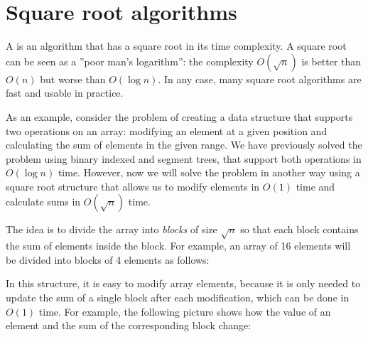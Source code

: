 \chapter{Square root algorithms}


A  is an algorithm
that has a square root in its time complexity.
A square root can be seen as a ''poor man's logarithm'':
the complexity $O(\sqrt n)$ is better than $O(n)$
but worse than $O(\log n)$.
In any case, many square root algorithms are fast and usable in practice.

As an example, consider the problem of
creating a data structure that supports
two operations on an array:
modifying an element at a given position
and calculating the sum of elements in the given range.
We have previously solved the problem using
binary indexed and segment trees,
that support both operations in $O(\log n)$ time.
However, now we will solve the problem
in another way using a square root structure
that allows us to modify elements in $O(1)$ time
and calculate sums in $O(\sqrt n)$ time.

The idea is to divide the array into \emph{blocks}
of size $\sqrt n$ so that each block contains
the sum of elements inside the block.
For example, an array of 16 elements will be
divided into blocks of 4 elements as follows:

\begin{center}
\end{center}

In this structure,
it is easy to modify array elements,
because it is only needed to update
the sum of a single block
after each modification,
which can be done in $O(1)$ time.
For example, the following picture shows
how the value of an element and
the sum of the corresponding block change:

